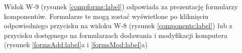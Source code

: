Widok W-9 (rysunek \ref{compforms:label}) odpowiada za prezentację formularzy komponentów. Formularze te mogą zostać wyświetlone po kliknięciu odpowiedniego przycisku na widoku W-8 (rysunek \ref{components:label}) lub z przycisku dostępnego na formularzach dodawania i modyfikacji komputera (rysunek \ref{formsAdd:label}a i \ref{formsMod:label}a)



